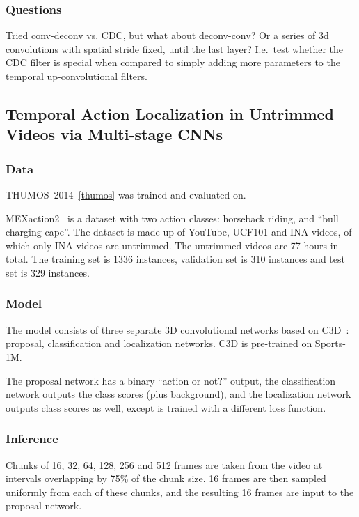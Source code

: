 \documentclass[a4paper, 12pt]{article}
\begin{document}
\subsubsection{Questions}

Tried conv-deconv vs. CDC, but what about deconv-conv? Or a series of 3d
convolutions with spatial stride fixed, until the last layer? I.e.\ test
whether the CDC filter is special when compared to simply adding more
parameters to the temporal up-convolutional filters.


\subsection{Temporal Action Localization in Untrimmed Videos via Multi-stage
            CNNs~\citet{DBLP:journals/corr/ShouWC16}}

\subsubsection{Data}

THUMOS~2014~\ref{thumos} was trained and evaluated on.

MEXaction2~\citet{MEXaction2} is a dataset with two action classes: horseback
riding, and ``bull charging cape''. The dataset is made up of YouTube, UCF101
and INA videos, of which only INA videos are untrimmed. The untrimmed videos
are 77 hours in total. The training set is 1336 instances, validation set is
310 instances and test set is 329 instances.

\subsubsection{Model}

The model consists of three separate 3D convolutional networks based
on C3D~\citet{DBLP:journals/corr/TranBFTP14}: proposal, classification and
localization networks. C3D is pre-trained on Sports-1M.

The proposal network has a binary ``action or not?'' output, the classification
network outputs the class scores (plus background), and the localization
network outputs class scores as well, except is trained with a different loss
function.

\subsubsection{Inference}

Chunks of 16, 32, 64, 128, 256 and 512 frames are taken from the video at
intervals overlapping by 75\% of the chunk size. 16 frames are then sampled
uniformly from each of these chunks, and the resulting 16 frames are input to
the proposal network.
\end{document}
